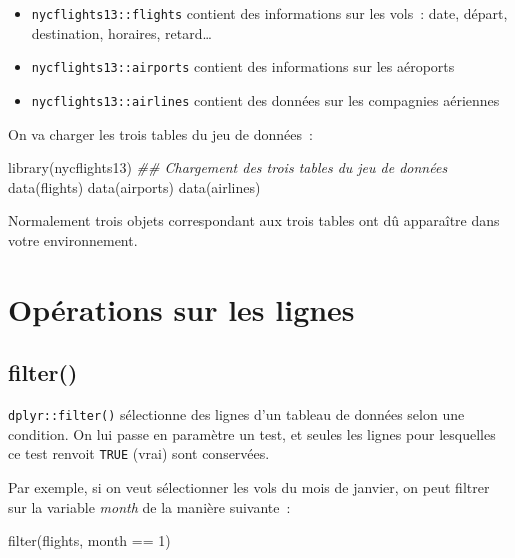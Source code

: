 \documentclass[
  letterpaper,
  DIV=11,
  numbers=noendperiod,
  oneside]{scrreprt}
\newenvironment{Shaded}{\begin{snugshade}}{\end{snugshade}}
\newcommand{\DecValTok}[1]{\textcolor[rgb]{0.68,0.00,0.00}{#1}}
\newcommand{\DocumentationTok}[1]{\textcolor[rgb]{0.37,0.37,0.37}{\textit{#1}}}
\newcommand{\FunctionTok}[1]{\textcolor[rgb]{0.28,0.35,0.67}{#1}}
\newcommand{\NormalTok}[1]{\textcolor[rgb]{0.00,0.23,0.31}{#1}}
\newcommand{\SpecialCharTok}[1]{\textcolor[rgb]{0.37,0.37,0.37}{#1}}
\providecommand{\tightlist}{%
  \setlength{\itemsep}{0pt}\setlength{\parskip}{0pt}}\usepackage{longtable,booktabs,array}
\begin{document}
\begin{itemize}
\tightlist
\item
  \texttt{nycflights13::flights} contient des informations sur les
  vols~: date, départ, destination, horaires, retard\ldots{}
\item
  \texttt{nycflights13::airports} contient des informations sur les
  aéroports
\item
  \texttt{nycflights13::airlines} contient des données sur les
  compagnies aériennes
\end{itemize}

On va charger les trois tables du jeu de données~:

\begin{Shaded}
\begin{Highlighting}[]
\FunctionTok{library}\NormalTok{(nycflights13)}
\DocumentationTok{\#\# Chargement des trois tables du jeu de données}
\FunctionTok{data}\NormalTok{(flights)}
\FunctionTok{data}\NormalTok{(airports)}
\FunctionTok{data}\NormalTok{(airlines)}
\end{Highlighting}
\end{Shaded}

Normalement trois objets correspondant aux trois tables ont dû
apparaître dans votre environnement.

\hypertarget{opuxe9rations-sur-les-lignes}{%
\section{Opérations sur les lignes}\label{opuxe9rations-sur-les-lignes}}

\hypertarget{filter}{%
\subsection{filter()}\label{filter}}

\texttt{dplyr::filter()} sélectionne des lignes d'un tableau de données
selon une condition. On lui passe en paramètre un test, et seules les
lignes pour lesquelles ce test renvoit \texttt{TRUE} (vrai) sont
conservées.

Par exemple, si on veut sélectionner les vols du mois de janvier, on
peut filtrer sur la variable \emph{month} de la manière suivante~:

\begin{Shaded}
\begin{Highlighting}[]
\FunctionTok{filter}\NormalTok{(flights, month }\SpecialCharTok{==} \DecValTok{1}\NormalTok{)}
\end{Highlighting}
\end{Shaded}
\end{document}
